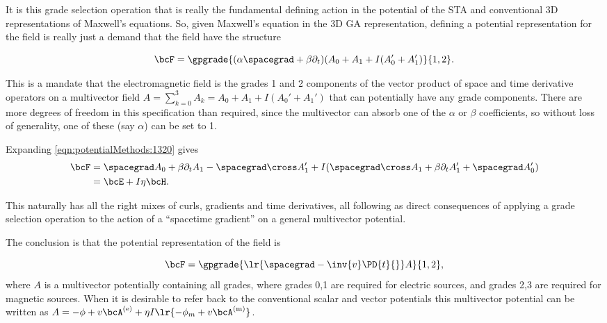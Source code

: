 It is this grade selection operation that is really the fundamental defining action in the potential of the STA and conventional 3D representations of Maxwell's equations.  So, given Maxwell's equation in the 3D GA representation, defining a potential representation for the field is really just a demand that the field have the structure

\begin{equation}\label{eqn:potentialMethods:1320}
\bcF = \gpgrade{ (\alpha \spacegrad + \beta \partial_t)( A_0 + A_1 + I( A_0' + A_1' ) }{1,2}.
\end{equation}

This is a mandate that the electromagnetic field is the grades 1 and 2 components of the vector product of space and time derivative operators on a multivector field \( A = \sum_{k=0}^3 A_k = A_0 + A_1 + I( A_0' + A_1' ) \) that can potentially have any grade components.  There are more degrees of freedom in this specification than required, since the multivector can absorb one of the \( \alpha \) or \( \beta \) coefficients, so without loss of generality, one of these (say \( \alpha\)) can be set to 1.

Expanding \cref{eqn:potentialMethods:1320} gives
\begin{equation}\label{eqn:potentialMethods:1340}
\begin{aligned}
\bcF
&=
\spacegrad A_0
+ \beta \partial_t A_1
- \spacegrad \cross A_1'
+ I (\spacegrad \cross A_1
+ \beta \partial_t A_1'
+ \spacegrad A_0') \\
&=
\bcE + I \eta \bcH.
\end{aligned}
\end{equation}

This naturally has all the right mixes of curls, gradients and time derivatives, all following as direct consequences of applying a grade selection operation to the action of a ``spacetime gradient'' on a general multivector potential.

The conclusion is that the potential representation of the field is

\begin{equation}\label{eqn:potentialMethods:1360}
\bcF =
\gpgrade{ \lr{ \spacegrad - \inv{v} \PD{t}{} } A }{1,2},
\end{equation}
where \( A \) is a multivector potentially containing all grades, where grades 0,1 are required for electric sources, and grades 2,3 are required for magnetic sources.  When it is desirable to refer back to the conventional scalar and vector potentials this multivector potential can be written as \( A = -\phi + v \bcA^\e + \eta I \lr{ -\phi_m + v \bcA^\m } \).

